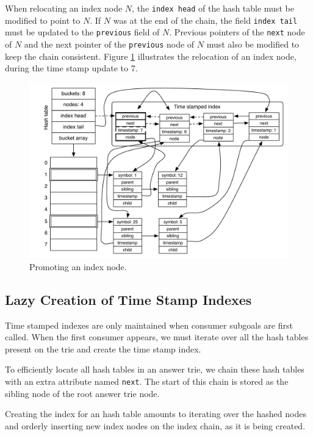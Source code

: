 When relocating an index node $N$, the \texttt{index head} of the hash table must be modified
to point to $N$. If $N$ was at the end of the chain,
the field \texttt{index tail} must be updated to the \texttt{previous} field of $N$.
Previous pointers of the \texttt{next} node of $N$ and the next pointer of
the \texttt{previous} node of $N$ must
also be modified to keep the chain consistent.
Figure \ref{fig:hash_table_promote} illustrates the relocation of an index node, during
the time stamp update to 7.

\begin{figure}[ht]
  \centering
    \includegraphics[scale=0.6]{hash_table_promote.pdf}
  \caption{Promoting an index node.}
  \label{fig:hash_table_promote}
\end{figure}

\subsection{Lazy Creation of Time Stamp Indexes}

Time stamped indexes are only maintained when consumer subgoals are first called.
When the first consumer appears, we must iterate over all the hash tables present
on the trie and create the time stamp index.

To efficiently locate all hash tables in an answer trie, we chain these hash tables
with an extra attribute named \texttt{next}. The start of this chain is stored
as the sibling node of the root answer trie node.

Creating the index for an hash table amounts to iterating over the hashed nodes
and orderly inserting new index nodes on the index chain, as it is being created.

